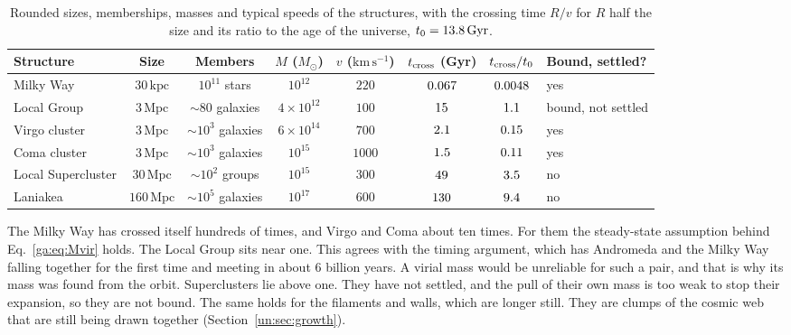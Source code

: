\begin{table}[htbp]
	\centering
	\footnotesize
	\setlength{\tabcolsep}{3pt}
	\begin{tabular}{@{}l c c c c c c p{1.7cm}@{}}
		\toprule
		\textbf{Structure} & \textbf{Size} & \textbf{Members} & $M$ ($M_\odot$) & $v$ ($\mathrm{km\,s^{-1}}$) & $t_{\rm cross}$ (Gyr) & $t_{\rm cross}/t_0$ & \textbf{Bound, settled?} \\
		\midrule
		Milky Way & $30\,\mathrm{kpc}$ & $10^{11}$ stars & $10^{12}$ & $220$ & $0.067$ & $0.0048$ & yes \\
		Local Group & $3\,\mathrm{Mpc}$ & $\sim80$ galaxies & $4\times10^{12}$ & $100$ & $15$ & $1.1$ & bound, not settled \\
		Virgo cluster & $3\,\mathrm{Mpc}$ & $\sim10^3$ galaxies & $6\times10^{14}$ & $700$ & $2.1$ & $0.15$ & yes \\
		Coma cluster & $3\,\mathrm{Mpc}$ & $\sim10^3$ galaxies & $10^{15}$ & $1000$ & $1.5$ & $0.11$ & yes \\
		Local Supercluster & $30\,\mathrm{Mpc}$ & $\sim10^2$ groups & $10^{15}$ & $300$ & $49$ & $3.5$ & no \\
		Laniakea & $160\,\mathrm{Mpc}$ & $\sim10^5$ galaxies & $10^{17}$ & $600$ & $130$ & $9.4$ & no \\
		\bottomrule
	\end{tabular}
	\caption{Rounded sizes, memberships, masses and typical speeds of the structures, with the crossing time $R/v$ for $R$ half the size and its ratio to the age of the universe, $t_0=13.8\,\mathrm{Gyr}$.}
	\label{ga:tab:hierarchy}
\end{table}
The Milky Way has crossed itself hundreds of times, and Virgo and Coma about ten times. For them the steady-state assumption behind Eq.~\eqref{ga:eq:Mvir} holds. The Local Group sits near one. This agrees with the timing argument, which has Andromeda and the Milky Way falling together for the first time and meeting in about $6$ billion years. A virial mass would be unreliable for such a pair, and that is why its mass was found from the orbit. Superclusters lie above one. They have not settled, and the pull of their own mass is too weak to stop their expansion, so they are not bound. The same holds for the filaments and walls, which are longer still. They are clumps of the cosmic web that are still being drawn together (Section~\ref{un:sec:growth}).

